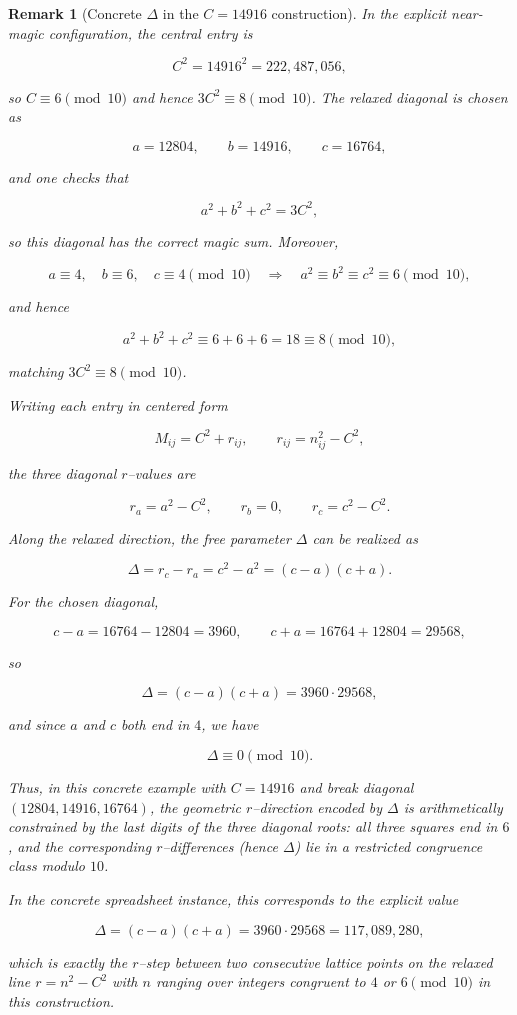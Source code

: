 \documentclass[12pt]{article}
\newtheorem{remark}{Remark}
\begin{document}
\begin{remark}[Concrete $\Delta$ in the $C=14916$ construction]
In the explicit near-magic configuration, the central entry is


\[
C^2 = 14916^2 = 222{,}487{,}056,
\]


so $C \equiv 6 \pmod{10}$ and hence $3C^2 \equiv 8 \pmod{10}$.  The relaxed
diagonal is chosen as


\[
a = 12804,\qquad b = 14916,\qquad c = 16764,
\]


and one checks that


\[
a^2 + b^2 + c^2 = 3C^2,
\]


so this diagonal has the correct magic sum.  Moreover,


\[
a \equiv 4,\quad b \equiv 6,\quad c \equiv 4 \pmod{10}
\quad\Longrightarrow\quad
a^2 \equiv b^2 \equiv c^2 \equiv 6 \pmod{10},
\]


and hence


\[
a^2 + b^2 + c^2 \equiv 6+6+6 = 18 \equiv 8 \pmod{10},
\]


matching $3C^2 \equiv 8 \pmod{10}$.

Writing each entry in centered form


\[
M_{ij} = C^2 + r_{ij},\qquad r_{ij} = n_{ij}^2 - C^2,
\]


the three diagonal $r$–values are


\[
r_a = a^2 - C^2,\qquad r_b = 0,\qquad r_c = c^2 - C^2.
\]


Along the relaxed direction, the free parameter $\Delta$ can be realized as


\[
\Delta = r_c - r_a = c^2 - a^2 = (c-a)(c+a).
\]


For the chosen diagonal,


\[
c-a = 16764 - 12804 = 3960,\qquad
c+a = 16764 + 12804 = 29568,
\]


so


\[
\Delta = (c-a)(c+a) = 3960\cdot 29568,
\]


and since $a$ and $c$ both end in $4$, we have


\[
\Delta \equiv 0 \pmod{10}.
\]


Thus, in this concrete example with $C=14916$ and break diagonal
$(12804,14916,16764)$, the geometric $r$–direction encoded by $\Delta$ is
arithmetically constrained by the last digits of the three diagonal roots: all
three squares end in $6$, and the corresponding $r$–differences (hence
$\Delta$) lie in a restricted congruence class modulo $10$.


In the concrete spreadsheet instance, this corresponds to the explicit value


\[
\Delta = (c-a)(c+a) = 3960\cdot 29568 = 117{,}089{,}280,
\]


which is exactly the $r$–step between two consecutive lattice points on the
relaxed line $r = n^2 - C^2$ with $n$ ranging over integers congruent to $4$
or $6 \pmod{10}$ in this construction.

\end{remark}
\end{document}
